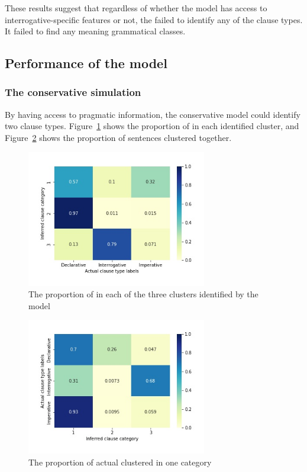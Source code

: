 These results suggest that regardless of whether the model has access to interrogative-specific features or not, the \dlearnerabbr{} failed to identify any of the clause types. It failed to find any meaning grammatical classes. 



\subsection{Performance of the \plearnerabbr{} model}
\label{sec:mancl:model:results:p}
\subsubsection{The conservative simulation}
By having access to pragmatic information, the conservative \plearnerabbr{} model could identify two clause types. Figure~\ref{fig:man-target-conservative-heatmap} shows the proportion of \diis{} in each identified cluster, and Figure~\ref{fig:man-target-conservative-heatrev} shows the proportion of sentences clustered together. 

\begin{figure}[H]
    \centering
    \includegraphics[width=0.7\textwidth]{figures/man-target-conservative-heatmap.jpg}
    \caption{The proportion of \diis{} in each of the three clusters identified by the \plearnerabbr{} model}
    \label{fig:man-target-conservative-heatmap}
\end{figure}




\begin{figure}[H]
    \centering
    \includegraphics[width=0.7\textwidth]{figures/man-target-conservative-heatrev.jpg}
    \caption{The proportion of actual \diis{} clustered in one category}
    \label{fig:man-target-conservative-heatrev}
\end{figure}


